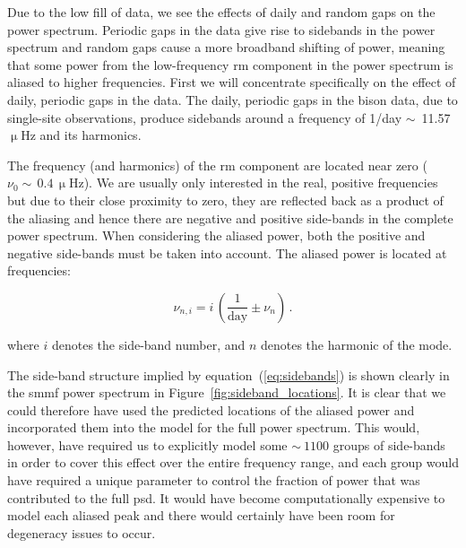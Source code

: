 Due to the low fill of data, we see the effects of daily and random gaps on the power spectrum. Periodic gaps in the data give rise to sidebands in the power spectrum and random gaps cause a more broadband shifting of power, meaning that some power from the low-frequency \gls{rm} component in the power spectrum is aliased to higher frequencies. First we will concentrate specifically on the effect of daily, periodic gaps in the data. The daily, periodic gaps in the \gls{bison} data, due to single-site observations, produce sidebands around a frequency of 1/day $\sim$~11.57 $\upmu$Hz and its harmonics.

The frequency (and harmonics) of the \gls{rm} component are located near zero ($\nu_0 \sim \,0.4 \, \upmu\mathrm{Hz}$). We are usually only interested in the real, positive frequencies but due to their close proximity to zero, they are reflected back as a product of the aliasing and hence there are negative and positive side-bands in the complete power spectrum. When considering the aliased power, both the positive and negative side-bands must be taken into account. The aliased power is located at frequencies:

\begin{equation}
\nu_{n, i} = i \, (\frac{1}{\mathrm{day}} \pm \nu_{n}) \, .
\label{eq:sidebands}
\end{equation}

where $i$ denotes the side-band number, and $n$ denotes the harmonic of the mode.

The side-band structure implied by equation~(\ref{eq:sidebands}) is shown clearly in the \gls{smmf} power spectrum in Figure~\ref{fig:sideband_locations}. It is clear that we could therefore have used the predicted locations of the aliased power and incorporated them into the model for the full power spectrum. This would, however, have required us to explicitly model some $\sim~1100$ groups of side-bands in order to cover this effect over the entire frequency range, and each group would have required a unique parameter to control the fraction of power that was contributed to the full \gls{psd}. It would have become computationally expensive to model each aliased peak and there would certainly have been room for degeneracy issues to occur.

